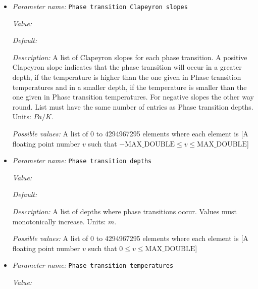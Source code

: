 \begin{itemize}
{\it Possible values:} A floating point number $v$ such that $0 \leq v \leq \text{MAX\_DOUBLE}$
\item {\it Parameter name:} {\tt Phase transition Clapeyron slopes}
\label{parameters:Material model/Grain size model/Phase transition Clapeyron slopes}
\label{parameters:Material_20model/Grain_20size_20model/Phase_20transition_20Clapeyron_20slopes}


{\it Value:} 


{\it Default:} 


{\it Description:} A list of Clapeyron slopes for each phase transition. A positive Clapeyron slope indicates that the phase transition will occur in a greater depth, if the temperature is higher than the one given in Phase transition temperatures and in a smaller depth, if the temperature is smaller than the one given in Phase transition temperatures. For negative slopes the other way round. List must have the same number of entries as Phase transition depths. Units: $Pa/K$.


{\it Possible values:} A list of 0 to 4294967295 elements where each element is [A floating point number $v$ such that $-\text{MAX\_DOUBLE} \leq v \leq \text{MAX\_DOUBLE}$]
\item {\it Parameter name:} {\tt Phase transition depths}
\label{parameters:Material model/Grain size model/Phase transition depths}
\label{parameters:Material_20model/Grain_20size_20model/Phase_20transition_20depths}


{\it Value:} 


{\it Default:} 


{\it Description:} A list of depths where phase transitions occur. Values must monotonically increase. Units: $m$.


{\it Possible values:} A list of 0 to 4294967295 elements where each element is [A floating point number $v$ such that $0 \leq v \leq \text{MAX\_DOUBLE}$]
\item {\it Parameter name:} {\tt Phase transition temperatures}
\label{parameters:Material model/Grain size model/Phase transition temperatures}
\label{parameters:Material_20model/Grain_20size_20model/Phase_20transition_20temperatures}


{\it Value:} 



\end{itemize}
